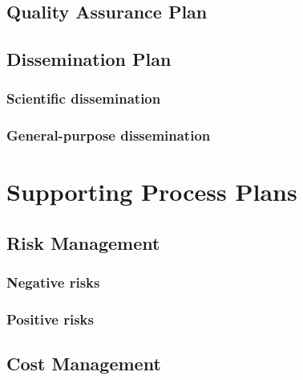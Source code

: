 \documentclass[a4paper, 10pt, oneside]{book}
\begin{document}
\section{Quality Assurance Plan}
\lipsum[1]

\section{Dissemination Plan}

\subsection{Scientific dissemination}
\lipsum[1]

\subsection{General-purpose dissemination}
\lipsum[1]

\chapter{Supporting Process Plans}
\lipsum[1]

\section{Risk Management} \label{sec:risk-management}
\lipsum[1]

\subsection{Negative risks}
\lipsum[1]

\subsection{Positive risks}
\lipsum[1]

\section{Cost Management} \label{sec:cost-management}
\lipsum[1]

\clearpage
\printglossary[type=\acronymtype]

\clearpage
\printbibliography[
heading=bibintoc,
title={References}
]
\clearpage
\end{document}
